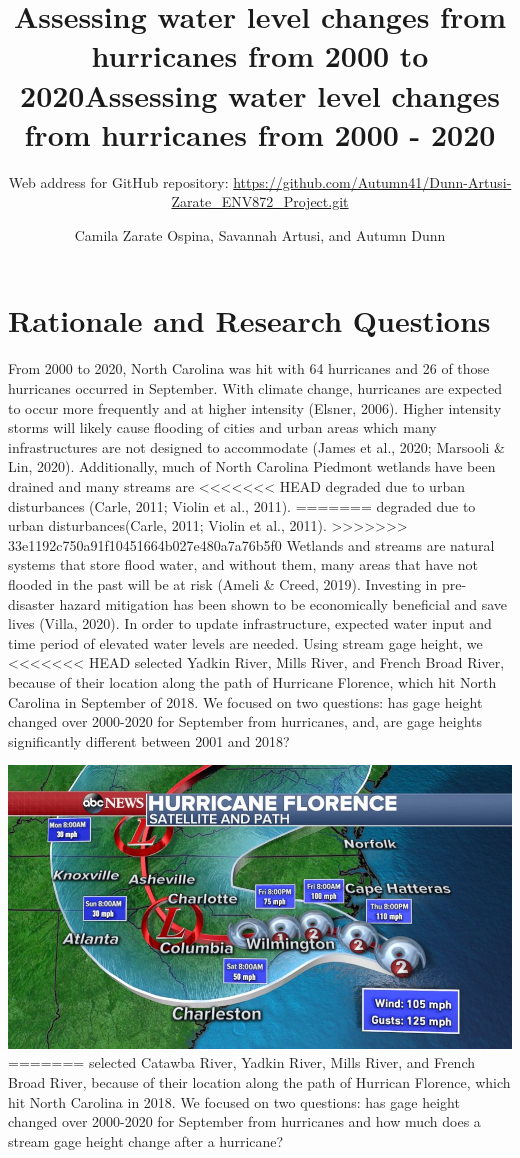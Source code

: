 \documentclass[
  12pt,
]{article}
\title{Assessing water level changes from hurricanes from 2000 to 2020}
\title{Assessing water level changes from hurricanes from 2000 - 2020}
\subtitle{Web address for GitHub repository:
\url{https://github.com/Autumn41/Dunn-Artusi-Zarate_ENV872_Project.git}}
\author{Camila Zarate Ospina, Savannah Artusi, and Autumn Dunn}
\date{}
\begin{document}
\maketitle

\newpage
\tableofcontents 
\newpage
\listoftables 
\newpage
\listoffigures 
\newpage

\hypertarget{rationale-and-research-questions}{%
\section{Rationale and Research
Questions}\label{rationale-and-research-questions}}

From 2000 to 2020, North Carolina was hit with 64 hurricanes and 26 of
those hurricanes occurred in September. With climate change, hurricanes
are expected to occur more frequently and at higher intensity (Elsner,
2006). Higher intensity storms will likely cause flooding of cities and
urban areas which many infrastructures are not designed to accommodate
(James et al., 2020; Marsooli \& Lin, 2020). Additionally, much of North
Carolina Piedmont wetlands have been drained and many streams are
<<<<<<< HEAD
degraded due to urban disturbances (Carle, 2011; Violin et al., 2011).
=======
degraded due to urban disturbances(Carle, 2011; Violin et al., 2011).
>>>>>>> 33e1192c750a91f10451664b027e480a7a76b5f0
Wetlands and streams are natural systems that store flood water, and
without them, many areas that have not flooded in the past will be at
risk (Ameli \& Creed, 2019). Investing in pre-disaster hazard mitigation
has been shown to be economically beneficial and save lives (Villa,
2020). In order to update infrastructure, expected water input and time
period of elevated water levels are needed. Using stream gage height, we
<<<<<<< HEAD
selected Yadkin River, Mills River, and French Broad River, because of
their location along the path of Hurricane Florence, which hit North
Carolina in September of 2018. We focused on two questions: has gage
height changed over 2000-2020 for September from hurricanes, and, are
gage heights significantly different between 2001 and 2018?

\includegraphics{../Literature/HurricaneFlorencePathNC.png}
=======
selected Catawba River, Yadkin River, Mills River, and French Broad
River, because of their location along the path of Hurrican Florence,
which hit North Carolina in 2018. We focused on two questions: has gage
height changed over 2000-2020 for September from hurricanes and how much
does a stream gage height change after a hurricane?
\end{document}

